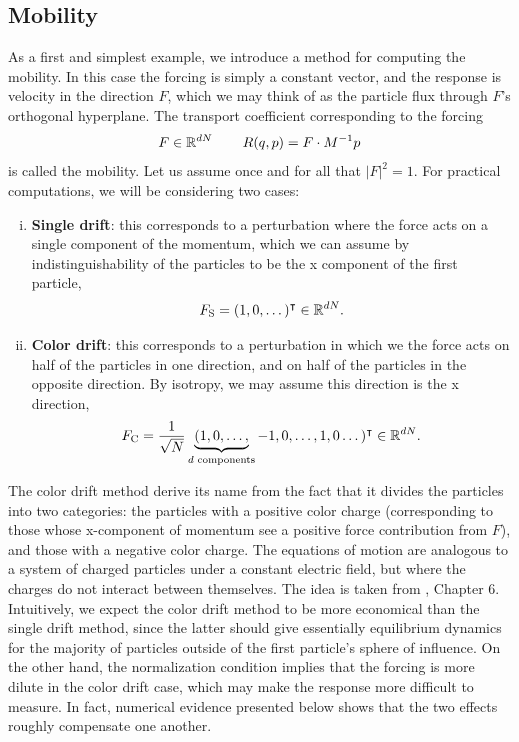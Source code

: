 \subsection{Mobility}\label{subsec:mobility}
As a first and simplest example, we introduce a method for computing the mobility. In this case the forcing is simply a constant vector, and the response is velocity in the direction $F$, which we may think of as the particle flux through $F$'s orthogonal hyperplane.
The transport coefficient corresponding to the forcing
\begin{equation}
    \label{eq:nemd_mobility_definitions}
    F\in \mathbb{R}^{dN}\,\qquad R(q,p)=F\cdot M^{-1}p
\end{equation}
is called the mobility.
Let us assume once and for all that $|F|^2=1$.
For practical computations, we will be considering two cases:
\begin{enumerate}[(i)]
    \item \textbf{Single drift}: this corresponds to a perturbation where the force acts on a single component of the momentum, which we can assume by indistinguishability of the particles to be the x component of the first particle, \[F_{\mathrm{S}}=(1,0,\dots)^\intercal \in \mathbb{R}^{dN}.\]
    \item \textbf{Color drift}: this corresponds to a perturbation in which we the force acts on half of the particles in one direction, and on half of the particles in the opposite direction. By isotropy, we may assume this direction is the x direction, \[F_{\mathrm{C}}=\frac1{\sqrt N}\underbrace{(1,0,\dots,}_{d \text{ components}}-1,0,\dots,1,0\dots)^\intercal \in \mathbb{R}^{dN}.\]
\end{enumerate}
The color drift method derive its name from the fact that it divides the particles into two categories: the particles with a positive color charge (corresponding to those whose x-component of momentum see a positive force contribution from $F$), and those with a negative color charge.
The equations of motion are analogous to a system of charged particles under a constant electric field, but where the charges do not interact between themselves.
The idea is taken from \cite{EM08}, Chapter 6. Intuitively, we expect the color drift method to be more economical than the single drift method, since the latter should give essentially equilibrium dynamics for the majority of particles outside of the first particle's sphere of influence.
On the other hand, the normalization condition implies that the forcing is more dilute in the color drift case, which may make the response more difficult to measure. In fact, numerical evidence presented below shows that the two effects roughly compensate one another.

